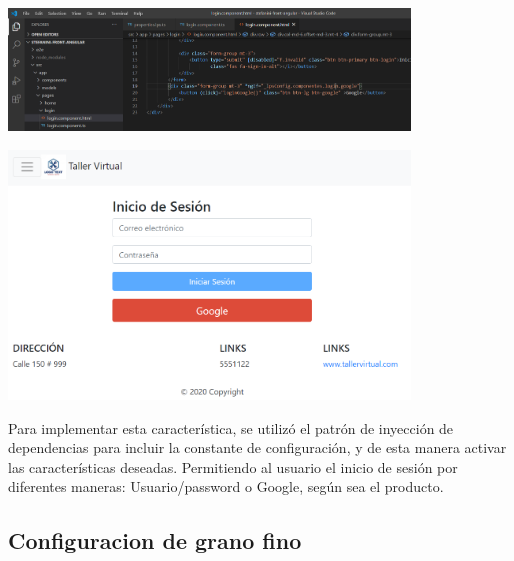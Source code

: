 \documentclass[10pt,a4paper,openany]{book}
\begin{document}
\begin{enumerate}
\begin{center}
\includegraphics[width=0.8\textwidth]{dn_2}

\includegraphics[width=0.8\textwidth]{dn_4}
\end{center}


Para implementar esta característica, se utilizó el patrón de inyección de dependencias para incluir la constante de configuración, y de esta manera activar las características deseadas.
Permitiendo al usuario el inicio de sesión por diferentes maneras: Usuario/password o Google, según sea el producto.

\end{enumerate}



\subsection{Configuracion de grano fino}
\end{document}
